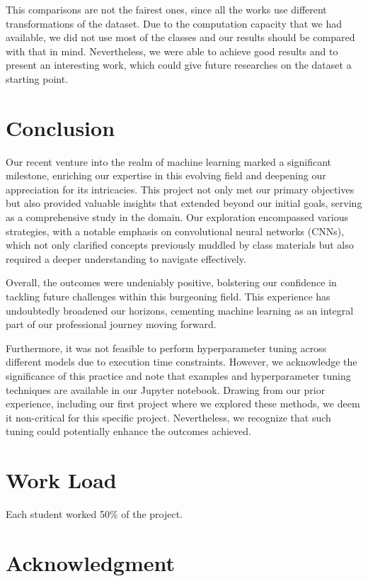 \documentclass[conference]{IEEEtran}
\begin{document}
This comparisons are not the fairest ones, since all the works use different transformations of the dataset. Due to the computation capacity that we had available, we did not use most of the classes and our results should be compared with that in mind. Nevertheless, we were able to achieve good results and to present an interesting work, which could give future researches on the dataset a starting point.

\section{Conclusion}

Our recent venture into the realm of machine learning marked a significant milestone, enriching our expertise in this evolving field and deepening our appreciation for its intricacies. This project not only met our primary objectives but also provided valuable insights that extended beyond our initial goals, serving as a comprehensive study in the domain. Our exploration encompassed various strategies, with a notable emphasis on convolutional neural networks (CNNs), which not only clarified concepts previously muddled by class materials but also required a deeper understanding to navigate effectively.

Overall, the outcomes were undeniably positive, bolstering our confidence in tackling future challenges within this burgeoning field. This experience has undoubtedly broadened our horizons, cementing machine learning as an integral part of our professional journey moving forward.

Furthermore, it was not feasible to perform hyperparameter tuning across different models due to execution time constraints. However, we acknowledge the significance of this practice and note that examples and hyperparameter tuning techniques are available in our Jupyter notebook. Drawing from our prior experience, including our first project where we explored these methods, we deem it non-critical for this specific project. Nevertheless, we recognize that such tuning could potentially enhance the outcomes achieved.

\section{Work Load}

Each student worked 50\% of the project.

\section{Acknowledgment}
\end{document}
